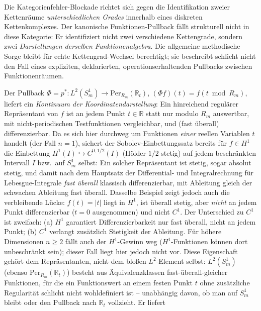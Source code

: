 Die Kategorienfehler-Blockade richtet sich gegen die Identifikation zweier
Kettenräume \emph{unterschiedlichen Grades} innerhalb eines diskreten
Kettenkomplexes. Der kanonische Funktionen-Pullback fällt strukturell
nicht in diese Kategorie: Er identifiziert nicht zwei verschiedene
Kettengrade, sondern zwei \emph{Darstellungen derselben
Funktionenalgebra}. Die allgemeine methodische Sorge bleibt für echte
Kettengrad-Wechsel berechtigt; sie beschreibt schlicht nicht den Fall
eines expliziten, deklarierten, operationserhaltenden Pullbacks zwischen
Funktionenräumen.

\begin{kernbox}[title={Präzisierung: zwei verschiedene Bedeutungen von ,,Kontinuum``}]
Der Pullback $\Phi=p^*:L^2(S^1_m)\to\mathrm{Per}_{R_m}(\mathbb{R}_t)$,
$(\Phi f)(t)=f(t\bmod R_m)$, liefert ein \emph{Kontinuum der
Koordinatendarstellung}: Ein hinreichend regulärer Repräsentant von $f$
ist an jedem Punkt $t\in\mathbb{R}$ statt nur modulo $R_m$ auswertbar,
mit nicht-periodischen Testfunktionen vergleichbar, und (fast überall)
differenzierbar. Da es sich hier durchweg um Funktionen \emph{einer}
reellen Variablen $t$ handelt (der Fall $n=1$), sichert der
Sobolev-Einbettungssatz bereits für $f\in H^1$ die Einbettung
$H^1(I)\hookrightarrow C^{0,1/2}(I)$ (Hölder-$1/2$-stetig) auf jedem
beschränkten Intervall $I$ bzw.\ auf $S^1_m$ selbst: Ein solcher
Repräsentant ist stetig, sogar absolut stetig, und damit nach dem
Hauptsatz der Differential- und Integralrechnung für Lebesgue-Integrale
\emph{fast überall} klassisch differenzierbar, mit Ableitung gleich der
schwachen Ableitung fast überall. Dasselbe Beispiel zeigt jedoch auch die
verbleibende Lücke: $f(t)=|t|$ liegt in $H^1$, ist überall stetig, aber
\emph{nicht} an jedem Punkt differenzierbar ($t=0$ ausgenommen) und
nicht $C^1$. Der Unterschied zu $C^1$ ist zweifach: (a) $H^1$ garantiert
Differenzierbarkeit nur fast überall, nicht an jedem Punkt; (b) $C^1$
verlangt zusätzlich Stetigkeit der Ableitung.
Für höhere Dimensionen $n\geq2$ fällt auch der $H^1$-Gewinn weg
($H^1$-Funktionen können dort unbeschränkt sein); dieser Fall liegt hier
jedoch nicht vor. Diese Eigenschaft gehört dem Repräsentanten, nicht dem
bloßen $L^2$-Element selbst: $L^2(S^1_m)$ (ebenso $\mathrm{Per}_{R_m}(\mathbb{R}_t)$)
besteht aus Äquivalenzklassen fast-überall-gleicher Funktionen, für die
ein Funktionswert an einem festen Punkt $t$ ohne zusätzliche Regularität
schlicht nicht wohldefiniert ist -- unabhängig davon, ob man auf $S^1_m$
bleibt oder den Pullback nach $\mathbb{R}_t$ vollzieht. Er liefert

\end{kernbox}
